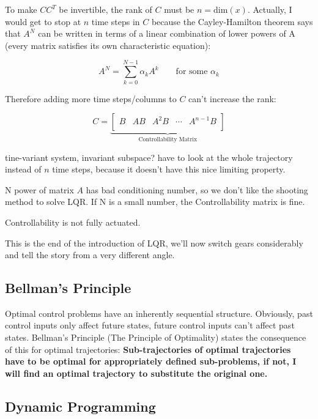 To make $CC^T$ be invertible, the rank of $C$ must be $n=\text{dim}(x)$. Actually, I would get to stop at $n$ time steps in $C$ because the Cayley-Hamilton theorem says that $A^N$ can be written in terms of a linear combination of lower powers of A (every matrix satisfies its own characteristic equation):

\begin{equation}
    A^N = \sum_{k=0}^{N-1}\alpha_kA^k\qquad\text{for some }\alpha_k
\end{equation}

Therefore adding more time steps/columns to $C$ can't increase the rank:

\begin{equation}
    C = \underset{\text{Controllability Matrix}}{\underbrace{\left[ \begin{matrix}
        B&		AB&		A^2B&		\cdots&		A^{n-1}B\\
    \end{matrix} \right] }}
\end{equation}

tine-variant system, invariant subspace? have to look at the whole trajectory instead of $n$ time steps, because it doesn't have this nice limiting property.

N power of matrix $A$ has bad conditioning number, so we don't like the shooting method to solve LQR. If N is a small number, the Controllability matrix is fine.

Controllability is not fully actuated.

This is the end of the introduction of LQR, we'll now switch gears considerably and tell the story from a very different angle.

\subsection{Bellman's Principle}

Optimal control problems have an inherently sequential structure. Obviously, past control inputs only affect future states, future control inputs can't affect past states. Bellman's Principle (The Principle of Optimality) states the consequence of this for optimal trajectories: \textbf{Sub-trajectories of optimal trajectories have to be optimal for appropriately defined sub-problems, if not, I will find an optimal trajectory to substitute the original one.}

\subsection{Dynamic Programming}

